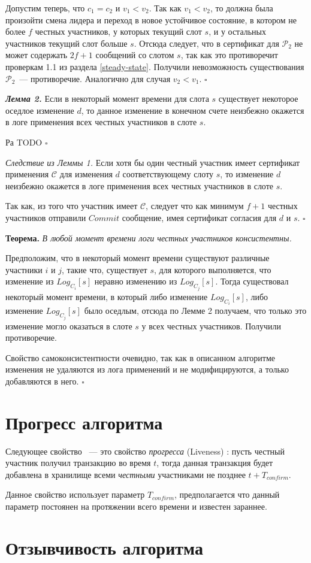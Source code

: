 Допустим теперь, что $c_1=c_2$ и $v_1 < v_2$. Так как $v_1 < v_2$, то должна была произойти смена лидера и переход в новое устойчивое состояние, в котором не более $f$ честных участников, у которых текущий слот $s$, и у остальных участников текущий слот больше $s$. Отсюда следует, что в сертификат для  $\mathcal{P}_2$ не может содержать $2f+1$ сообщений со слотом $s$, так как это противоречит проверкам 1.1 из раздела \ref{steady-state}.  Получили невозможность существования $\mathcal{P}_2$~--- противоречие. Аналогично для случая $v_2 < v_1$.
$\square$

\textbf{\textit{Лемма 2.}} Если в некоторый момент времени для слота $s$ существует некоторое оседлое изменение $d$, то данное изменение в конечном счете неизбежно окажется в логе применения всех честных участников в слоте $s$.

Ра
TODO $\square$

\vspace{10pt}

\textit{Следствие из Леммы 1.} Если хотя бы один честный участник имеет сертификат применения $\mathcal{C}$ для изменения $d$ соответствующему слоту $s$, то  изменение $d$ неизбежно окажется в логе применения всех честных участников в слоте $s$. 

Так как, из того что участник имеет $\mathcal{C}$, следует что как минимум $f+1$ честных участников отправили $Commit$ сообщение, имея сертификат согласия для $d$ и $s$. $\square$
\vspace{10pt}

\textbf{Теорема.} \textit{В любой момент времени логи честных участников консистентны.}

Предположим, что в некоторый момент времени существуют различные участники $i$ и $j$, такие что, существует $s$, для которого выполняется, что изменение из $Log_{C_i}[s]$ неравно изменению из $Log_{C_j}[s]$. Тогда существовал некоторый момент времени, в который либо изменение $Log_{C_i}[s]$, либо изменение $Log_{C_j}[s]$ было оседлым, отсюда по Лемме 2 получаем, что только это изменение могло оказаться в слоте $s$ у всех честных участников. Получили противоречие.

Свойство самоконсистентности очевидно, так как в описанном алгоритме изменения не удаляются из лога применений и не модифицируются, а только добавляются в него. $\square$

\section{Прогресс алгоритма}
\noindent Следующее свойство ~--- это свойство \textit{прогресса} (Liveness) \cite{hybrid-consensus}:
пусть честный участник получил транзакцию во время $t$, тогда данная транзакция будет добавлена в хранилище всеми \textit{честными} участниками не позднее $t + T_{confirm}$.

Данное свойство использует параметр $T_{confirm}$, предполагается что данный параметр постоянен на протяжении всего времени и известен зараннее.

\section{Отзывчивость алгоритма}
